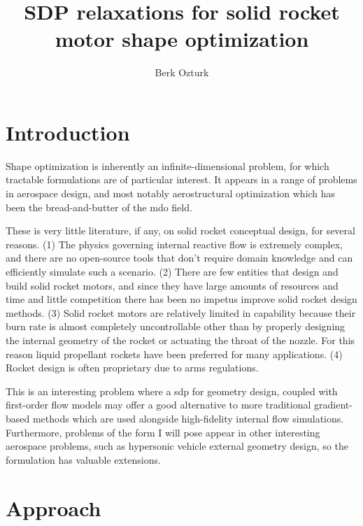\documentclass[11pt]{article}
\begin{document}
    \title{SDP relaxations for solid rocket motor shape optimization}
    \author{Berk Ozturk}
    \maketitle

    \section{Introduction}
    
    Shape optimization is inherently an infinite-dimensional problem,
for which tractable formulations are of particular interest.
    It appears in a range of problems in aerospace design, and most notably
    aerostructural optimization which has been the bread-and-butter of the \gls{mdo} field.

	These is very little literature, if any, on solid rocket conceptual design,
for several reasons. (1) The physics governing internal reactive flow is extremely complex,
and there are no open-source tools that don't require domain knowledge and
can efficiently simulate such a scenario.
(2) There are few entities that design and build solid rocket motors, and since they have
large amounts of resources and time and little competition there has been no impetus
improve solid rocket design methods. (3) Solid rocket motors are relatively limited
in capability because their burn rate is almost completely uncontrollable other
than by properly designing the internal geometry of the rocket or actuating the
throat of the nozzle. For this reason liquid propellant rockets have been preferred for
many applications. (4) Rocket design is often proprietary due to arms regulations.

This is an interesting problem where a \gls{sdp} for geometry design,
    coupled with first-order flow models may offer a good alternative to
    more traditional gradient-based methods which are used alongside
    high-fidelity internal flow simulations.
    Furthermore, problems of the form I will pose appear in other interesting
    aerospace problems, such as hypersonic vehicle external geometry design,
    so the formulation has valuable extensions.

    

    \section{Approach}
    
\end{document}
